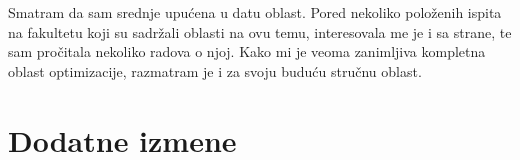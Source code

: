\documentclass[a4paper]{report}
\begin{document}
Smatram da sam srednje upućena u datu oblast. Pored nekoliko položenih  ispita na fakultetu koji su sadržali oblasti na ovu temu, interesovala me je i sa strane, te sam pročitala nekoliko radova o njoj. Kako mi je veoma zanimljiva kompletna oblast optimizacije, razmatram je i za svoju buduću stručnu oblast. 





\chapter{Dodatne izmene}
\end{document}
